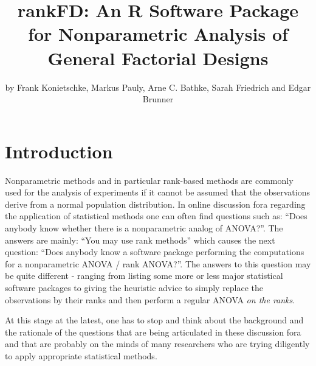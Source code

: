 \title{rankFD: An R Software Package for Nonparametric Analysis of General Factorial Designs}
\author{by Frank Konietschke, Markus Pauly, Arne C. Bathke, Sarah Friedrich and Edgar Brunner}

\maketitle



\section{Introduction} \label{int}

Nonparametric methods and in particular rank-based methods are commonly used 
for the analysis of experiments if it cannot be assumed that the observations 
derive from a normal population distribution. In online discussion fora 
regarding the application of statistical methods one can often find questions 
such as: ``Does anybody know whether there is a nonparametric analog of ANOVA?''. 
The answers are mainly: ``You may use rank methods'' which causes the next 
question: ``Does anybody know a software package performing the computations 
for a nonparametric ANOVA / rank ANOVA?''. The answers to this question may be 
quite different - ranging from listing some more or less major statistical 
software packages to giving the heuristic advice to simply replace the 
observations by their ranks and then perform a regular ANOVA {\em on the 
ranks}. 

At this stage at the latest, one has to stop and think about the background and 
the rationale of the questions that are being articulated in these discussion 
fora and that are probably on the minds of many researchers who are trying 
diligently to apply appropriate statistical methods.


